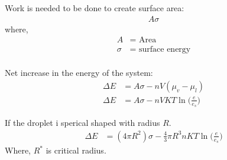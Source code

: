 \documentclass[fleqn,10pt]{SelfArx} %
\begin{document}
Work is needed to be done to create surface area:
\begin{align}
    A \sigma
\end{align}
where,
\begin{align*}
    A &= \text{ Area} \\
    \sigma &= \text{ surface energy} \\
\end{align*}

Net increase in the energy of the system: 
\begin{align}
    \Delta E &= A\sigma - nV(\mu_v -\mu_l) \\
    \Delta E &= A\sigma - nVKT \ln{\Big(\frac{e}{e_s}\Big)}
\end{align}

If the droplet i sperical shaped with radius $R$.
\begin{align}
    \Delta E &= (4\pi R^2)\sigma - \frac{4}{3}\pi R^3nKT \ln{\Big(\frac{e}{e_s}\Big)}
\end{align}
Where, $R^*$ is critical radius.
\end{document}
